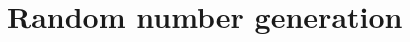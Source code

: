 \section{Random number generation}
\label{sec:random-number-generation}

\lipsum[1]

\lipsum[1]

\lipsum[1]
